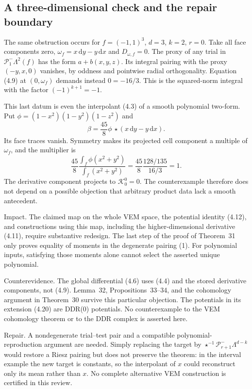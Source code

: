 \documentclass[10pt]{article}
\begin{document}
\subsection*{A three-dimensional check and the repair boundary}
The same obstruction occurs for \(f=(-1,1)^3\), \(d=3\), \(k=2\), \(r=0\). Take all face components zero, \(\omega_f=x\,\mathrm dy-y\,\mathrm dx\) and \(D_{\omega,f}=0\). The proxy of any trial in \(\mathcal P^-_1\Lambda^2(f)\) has the form \(a+b(x,y,z)\). Its integral pairing with the proxy \((-y,x,0)\) vanishes, by oddness and pointwise radial orthogonality. Equation (4.9) at \((0,\omega_f)\) demands instead \(0=-16/3\). This is the squared-norm integral with the factor \((-1)^{k+1}=-1\).\par
This last datum is even the interpolant (4.3) of a smooth polynomial two-form. Put \(\phi=(1-x^2)(1-y^2)(1-z^2)\) and \[\beta=\frac{45}{8}\phi\,\star(x\,\mathrm dy-y\,\mathrm dx).\] Its face traces vanish. Symmetry makes its projected cell component a multiple of \(\omega_f\), and the multiplier is \[\frac{45}{8}
 \frac{\int_f\phi(x^2+y^2)}{\int_f(x^2+y^2)}
 =\frac{45}{8}\frac{128/135}{16/3}=1.\] The derivative component projects to \(\mathcal K^0_0=0\). The counterexample therefore does not depend on a possible objection that arbitrary product data lack a smooth antecedent.\par
Impact. The claimed map on the whole VEM space, the potential identity (4.12), and constructions using this map, including the higher-dimensional derivative (4.11), require substantive redesign. The last step of the proof of Theorem 31 only proves equality of moments in the degenerate pairing (1). For polynomial inputs, satisfying those moments alone cannot select the asserted unique polynomial.\par
Counterevidence. The global differential (4.6) uses (4.4) and the stored derivative components, not (4.9). Lemma 32, Propositions 33–34, and the cohomology argument in Theorem 30 survive this particular objection. The potentials in its extension (4.20) are DDR(0) potentials. No counterexample to the VEM cohomology theorem or to the DDR complex is asserted here.\par
Repair. A nondegenerate trial–test pair and a compatible polynomial-reproduction argument are needed. Simply replacing the target by \(\star^{-1}\mathcal P^-_{r+1}\Lambda^{d-k}\) would restore a Riesz pairing but does not preserve the theorem: in the interval example the new target is constants, so the interpolant of \(x\) could reconstruct only its mean rather than \(x\). No complete alternative VEM construction is certified in this review.\par
\end{document}
